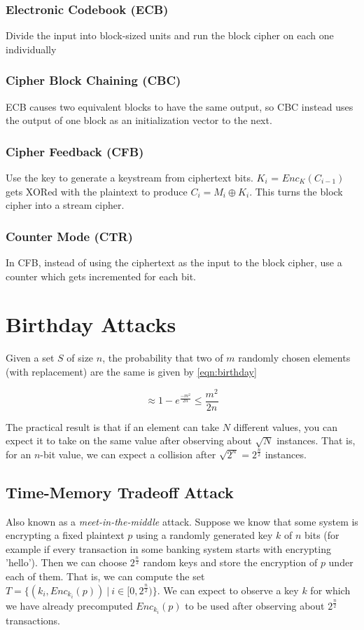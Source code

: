 \documentclass[11pt]{report}
\begin{document}
\subsubsection{Electronic Codebook (ECB)}
Divide the input into block-sized units and run the block cipher on each one individually

\subsubsection{Cipher Block Chaining (CBC)}
ECB causes two equivalent blocks to have the same output, so CBC instead uses the output of one block as an initialization vector to the next.

\subsubsection{Cipher Feedback (CFB)}
Use the key to generate a keystream from ciphertext bits. $K_i$ = $Enc_{K}(C_{i-1})$ gets XORed with the plaintext to produce $C_i = M_i \oplus K_i$. This turns the block cipher into a stream cipher.

\subsubsection{Counter Mode (CTR)}
In CFB, instead of using the ciphertext as the input to the block cipher, use a counter which gets incremented for each bit.

\section{Birthday Attacks}

Given a set $S$ of size $n$, the probability that two of $m$ randomly chosen elements (with replacement) are the same is given by \autoref{eqn:birthday}

\begin{equation}
	\label{eqn:birthday}
	\approx 1 - e^{\frac{-m^2}{2n}} \le \frac{m^2}{2n}
\end{equation}

The practical result is that if an element can take $N$ different values, you can expect it to take on the same value after observing about $\sqrt{N}$ instances. That is, for an $n$-bit value, we can expect a collision after $\sqrt{2^n} = 2^\frac{n}{2}$ instances.

\subsection{Time-Memory Tradeoff Attack}
Also known as a \textit{meet-in-the-middle} attack. Suppose we know that some system is encrypting a fixed plaintext $p$ using a randomly generated key $k$ of $n$ bits (for example if every transaction in some banking system starts with encrypting 'hello'). Then we can choose $2^{\frac{n}{2}}$ random keys and store the encryption of $p$ under each of them. That is, we can compute the set $T = \{(k_i, Enc_{k_i}(p)) \ | \ i \in [0, 2^{\frac{n}{2}})\}$. We can expect to observe a key $k$ for which we have already precomputed $Enc_{k_i}(p)$ to be used after observing about $2^{\frac{n}{2}}$ transactions.
\end{document}
